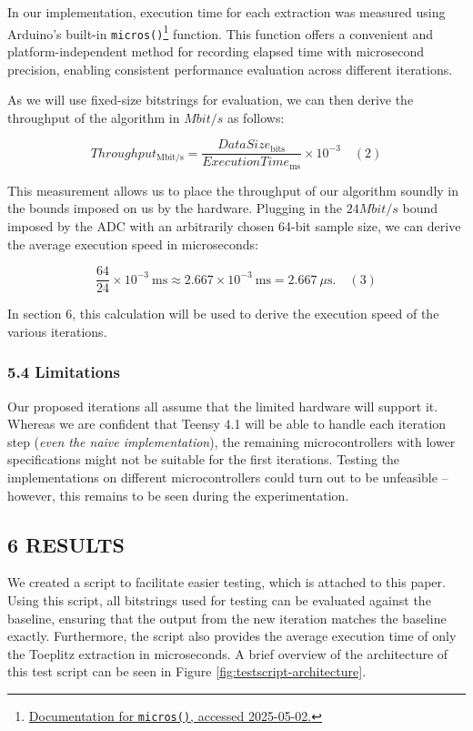 In our implementation, execution time for each extraction was measured using Arduino's built-in \texttt{micros()}\footnote{\href{https://docs.arduino.cc/language-reference/en/functions/time/micros/}{Documentation for \texttt{micros()}, accessed 2025-05-02.}} function. This function offers a convenient and platform-independent method for recording elapsed time with microsecond precision, enabling consistent performance evaluation across different iterations.

As we will use fixed-size bitstrings for evaluation, we can then derive the throughput of the algorithm in \(Mbit/s\) as follows:

\[
Throughput_\mathrm{Mbit/s}
= \frac{DataSize_\mathrm{bits}}{ExecutionTime_\mathrm{ms}}
\times 10^{-3}
\phantom{12}(2)
\]

This measurement allows us to place the throughput of our algorithm soundly in the bounds imposed on us by the hardware. Plugging in the \(24 Mbit/s\) bound imposed by the ADC with an arbitrarily chosen 64-bit sample size, we can derive the average execution speed in microseconds:

\[
\frac{64}{24}\times10^{-3}\ \mathrm{ms}
\approx 2.667\times10^{-3}\ \mathrm{ms}
=2.667\ \mu\mathrm{s}.
\phantom{12}(3)
\]

In section 6, this calculation will be used to derive the execution speed of the various iterations.

\hypertarget{limitations}{%
\subsubsection{5.4 Limitations}\label{limitations}}

Our proposed iterations all assume that the limited hardware will support it. Whereas we are confident that Teensy 4.1 will be able to handle each iteration step (\emph{even the naive implementation}), the remaining microcontrollers with lower specifications might not be suitable for the first iterations. Testing the implementations on different microcontrollers could turn out to be unfeasible -- however, this remains to be seen during the experimentation.

\hypertarget{results}{%
\subsection{6 RESULTS}\label{results}}

We created a script to facilitate easier testing, which is attached to this paper. Using this script, all bitstrings used for testing can be evaluated against the baseline, ensuring that the output from the new iteration matches the baseline exactly. Furthermore, the script also provides the average execution time of only the Toeplitz extraction in microseconds. A brief overview of the architecture of this test script can be seen in Figure \ref{fig:testscript-architecture}.


